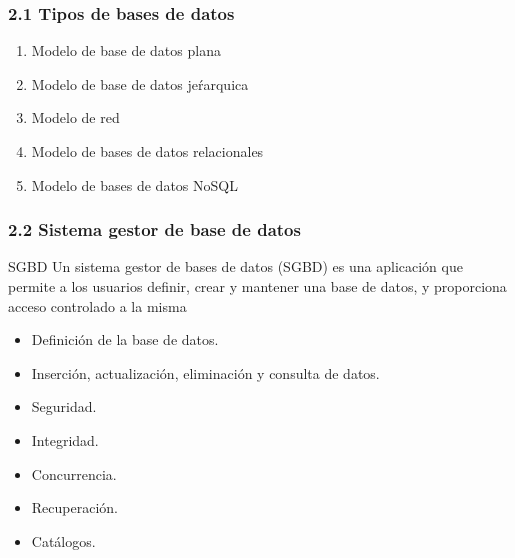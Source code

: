 \documentclass{beamer}
\begin{document}


\begin{frame}

	\frametitle{2.1 Tipos de bases de datos}
	
	\begin{enumerate} [<+-| only@+>]
		\item Modelo de base de datos plana
		\item Modelo de base de datos jeŕarquica
		\item Modelo de red
		\item Modelo de bases de datos relacionales
		\item Modelo de bases de datos NoSQL 
	\end{enumerate}
	
	
	
	
	

	
\end{frame}
	

\begin{frame}

	\frametitle{2.2 Sistema gestor de base de datos}
	
	\begin{block}{SGBD}
		Un sistema gestor de bases de datos (SGBD) es una aplicación que permite a los
		usuarios definir, crear y mantener una base de datos, y proporciona acceso controlado a
		la misma
	\end{block}
	
	\begin{itemize}
		\item Definición de la base de datos.
		\item Inserción, actualización, eliminación y consulta de datos.
		\item Seguridad.
		\item Integridad.
		\item Concurrencia.
		\item Recuperación.
		\item Catálogos.
	\end{itemize}
	
\end{frame}
	
\end{document}
